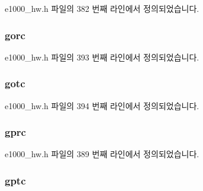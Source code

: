 e1000\+\_\+hw.\+h 파일의 382 번째 라인에서 정의되었습니다.

\subsubsection[{\texorpdfstring{gorc}{gorc}}]{ gorc}\hypertarget{structe1000__hw__stats_a8afeb07966861fbd77e371eef140e07b}{}\label{structe1000__hw__stats_a8afeb07966861fbd77e371eef140e07b}


e1000\+\_\+hw.\+h 파일의 393 번째 라인에서 정의되었습니다.

\subsubsection[{\texorpdfstring{gotc}{gotc}}]{ gotc}\hypertarget{structe1000__hw__stats_a66dd623bc9ffa4200bef558e641312c6}{}\label{structe1000__hw__stats_a66dd623bc9ffa4200bef558e641312c6}


e1000\+\_\+hw.\+h 파일의 394 번째 라인에서 정의되었습니다.

\subsubsection[{\texorpdfstring{gprc}{gprc}}]{ gprc}\hypertarget{structe1000__hw__stats_ab90e4f8c4448e3c778828af9ee227c6c}{}\label{structe1000__hw__stats_ab90e4f8c4448e3c778828af9ee227c6c}


e1000\+\_\+hw.\+h 파일의 389 번째 라인에서 정의되었습니다.

\subsubsection[{\texorpdfstring{gptc}{gptc}}]{ gptc}\hypertarget{structe1000__hw__stats_abe6e55e8e33ce8233c590bb603245b89}{}\label{structe1000__hw__stats_abe6e55e8e33ce8233c590bb603245b89}


